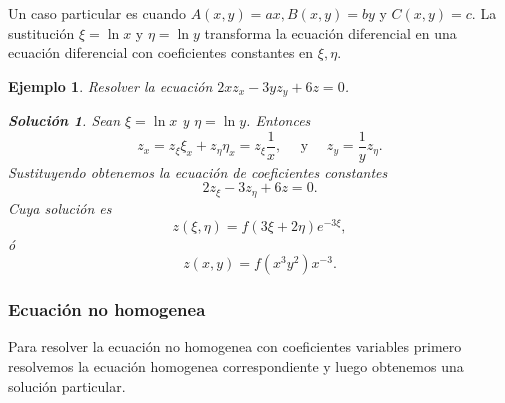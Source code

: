 \documentclass[11pt,letterpaper]{report}
\newtheorem{example}[defn]{Ejemplo}
\newtheorem*{sol}{Solución}
\newcommand\<{\langle}
\renewcommand\>{\rangle}
\begin{document}
Un caso particular es cuando $A(x,y) = ax, B(x,y) = by$ y
$C(x,y) = c$. La sustitución $\xi = \ln x$ y $\eta = \ln
y$ transforma la ecuación diferencial en una ecuación
diferencial con coeficientes constantes en $\xi, \eta$.

\begin{example}
  Resolver la ecuación $2x z_x - 3yz_y + 6z = 0$.
  \begin{sol}
    Sean $\xi = \ln x$ y $\eta = \ln y$. Entonces
    \[
    z_x = z_\xi \xi_x + z_\eta \eta_x = z_\xi \frac{1}{x},
    \quad \text{ y } \quad z_y = \frac{1}{y} z_\eta.
    \] 
    Sustituyendo obtenemos la ecuación de coeficientes
    constantes
    \[
    2z_\xi - 3z_\eta + 6z = 0.
    \] 
    Cuya solución es
    \[
    z(\xi,\eta) = f(3\xi + 2\eta)e^{-3\xi},
    \] 
    ó
    \[
    z(x,y) = f(x^3y^2)x^{-3}.
    \] 
  \end{sol}
\end{example}

\subsubsection{Ecuación no homogenea}

Para resolver la ecuación no homogenea con coeficientes
variables primero resolvemos la ecuación homogenea
correspondiente y luego obtenemos una solución particular.
\end{document}
